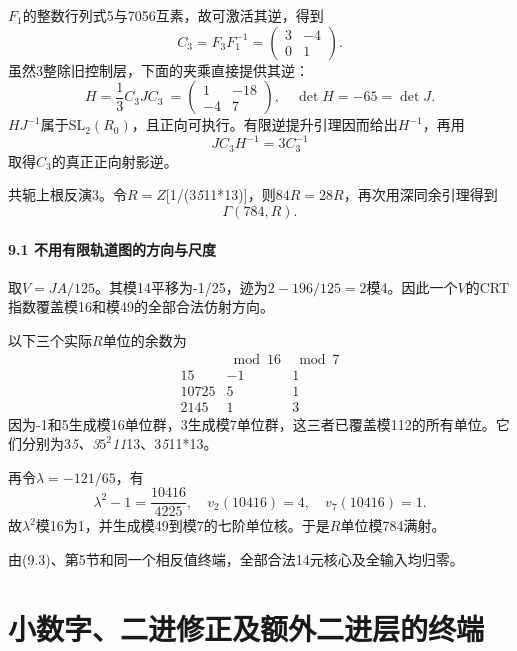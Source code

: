 {\ensuremath{F_{1}}的整数行列式5与7056互素，故可激活其逆，得到} \[
C_3=F_3F_1^{-1}=\begin{pmatrix}3&-4\\0&1\end{pmatrix}.
\] {虽然3整除旧控制层，下面的夹乘直接提供其逆：} \[
H=\frac13C_3JC_3
\ =\begin{pmatrix}1&-18\\-4&7\end{pmatrix},
\quad \det H=-65=\det J.
\tag{C16.9.2}
\] {\ensuremath{HJ^{-1}}属于\ensuremath{\mathrm{SL}_{2}(R_{0})}，且正向可执行。有限逆提升引理因而给出\ensuremath{H^{-1}}，再用} \[
JC_3H^{-1}=3C_3^{-1}
\] {取得\ensuremath{C_{3}}的真正正向射影逆。}

{共轭上根反演3。令\ensuremath{R=Z}{[}1/(3}\emph{{5}}{11*13){]}，则\ensuremath{84R=28R}，再次用深同余引理得到} \[
\boxed{\Gamma(784,R).}
\tag{C16.9.3}
\]

\paragraph*{\texorpdfstring{{9.1} {不用有限轨道图的方向与尺度}}{9.1 不用有限轨道图的方向与尺度}}\label{C16-h122}

{取\ensuremath{V=JA/125}。其模14平移为-1/25，迹为\ensuremath{2-196/125=2}模4。因此一个\ensuremath{V}的CRT指数覆盖模16和模49的全部合法仿射方向。}

{以下三个实际\ensuremath{R}单位的余数为} \[
\begin{array}{c|cc}
&\bmod16&\bmod7\\ \hline
15&-1&1\\
10725&5&1\\
2145&1&3
\end{array}
\] {因为-1和5生成模16单位群，3生成模7单位群，这三者已覆盖模112的所有单位。它们分别为3}\emph{{5、3}}{\ensuremath{5^{2}}}\emph{{11}}{13、3}\emph{{5}}{11*13。}

{再令\ensuremath{\lambda =-121/65}，有} \[
\lambda^2-1=\frac{10416}{4225},
\quad v_2(10416)=4,\quad v_7(10416)=1.
\] {故\ensuremath{\lambda ^{2}}模16为1，并生成模49到模7的七阶单位核。于是\ensuremath{R}单位模784满射。}

{由(9.3)、第5节和同一个相反值终端，全部合法14元核心及全输入均归零。}


\section{小数字、二进修正及额外二进层的终端}\label{construct:small-digit}

